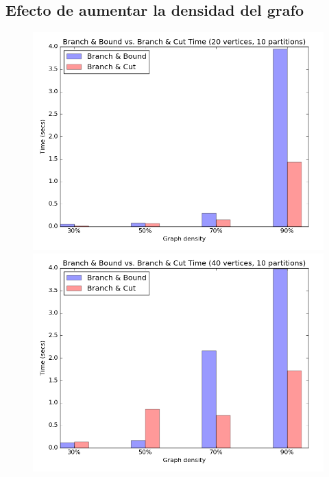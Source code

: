 \pagebreak

\subsection{Efecto de aumentar la densidad del grafo}

\begin{figure}[h]
  \centering
  \begin{minipage}[b]{0.49\textwidth}
    \includegraphics[width=\textwidth]{img/1-bb_vs_bc_v20_p10_i1_co0_l40_t1_b0.png}
  \end{minipage}
  \hfill
  \begin{minipage}[b]{0.49\textwidth}
    \includegraphics[width=\textwidth]{img/1-bb_vs_bc_v40_p10_i1_co0_l40_t1_b0.png}

\end{minipage}
\end{figure}
